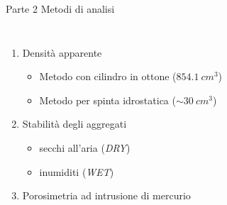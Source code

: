 \documentclass[xcolor={usenames, table, x11names}, final, 10pt]{beamer}
\begin{document}
\begin{frame}{Parte 2 \small{Metodi di analisi}}
  \begin{columns}[T]
    \begin{enumerate}
    \item<1->Densità  apparente
      \begin{itemize}
      \item<2-> Metodo con cilindro in ottone ($854.1\: cm^3$)
      \item<4-> Metodo per spinta idrostatica ($\sim 30 \: cm^3$)
      \end{itemize}
    \item<6-> Stabilità degli aggregati
      \begin{itemize}
      \item<7-> secchi all'aria (\emph{DRY})
      \item<7-> inumiditi (\emph{WET})
      \end{itemize}
    \item<8-> Porosimetria ad intrusione di mercurio      
    \end{enumerate}
    \begin{overlayarea}{\textwidth}{0.7\textheight}
\end{overlayarea}
\end{columns}
\end{frame}
\end{document}
